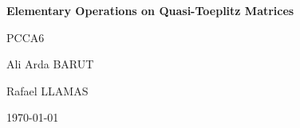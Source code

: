 \documentclass[a4paper, 11pt]{article}
\begin{document}
\begin{titlepage}
    \centering
    \vspace*{5cm}
    {\Huge \textbf{Elementary Operations on Quasi-Toeplitz Matrices} \par}
    \vspace*{0.5cm}
    {\Large PCCA6 \par}
    \vfill
    {\Large Ali Arda BARUT \par}
    {\Large Rafael LLAMAS \par}
    \vspace*{1cm}
    {\large \today \par}
\end{titlepage}
\tableofcontents
\vspace*{\fill}
\noindent
{}
\newpage









\newpage



\newpage

\end{document}
